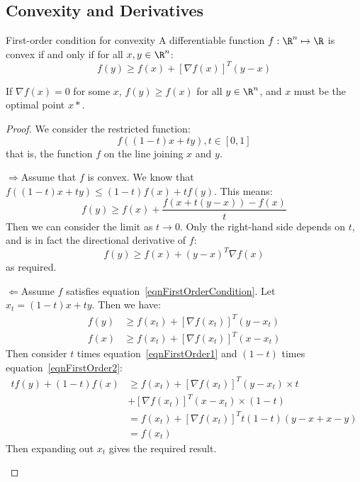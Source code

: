 \documentclass[../Main.tex]{subfiles}
\begin{document}
\subsection{Convexity and Derivatives}
\begin{theorem}{First-order condition for convexity}
    A differentiable function $f : \R^n \mapsto \R$ is convex if and only if for all $x, y \in \R^n$:
    \begin{equation}
        f(y) \geq f(x) + \left[\nabla f(x)\right]^T(y - x)
        \label{eqnFirstOrderCondition}
    \end{equation}
    \label{thmFirstOrderCondition}
\end{theorem}
\begin{remark}
    If $\nabla f(x) = 0$ for some $x$, $f(y) \geq f(x)$ for all $y \in \R^n$, and $x$ must be the optimal point $x*$.
\end{remark}
\begin{proof}
    We consider the restricted function:
    \begin{equation*}
        f((1-t)x + ty), t \in [0, 1]
    \end{equation*}
    that is, the function $f$ on the line joining $x$ and $y$.
    \begin{proofdirection}{$\Rightarrow$}{Assume that $f$ is convex.}
        We know that $f((1-t)x + ty) \leq (1-t)f(x) + tf(y)$. This means:
        \begin{equation*}
            f(y) \geq f(x) + \frac{f(x + t(y-x)) - f(x)}{t}
        \end{equation*}
        Then we can consider the limit as $t \to 0$. Only the right-hand side depends on $t$, and is in fact the directional derivative of $f$:
        \begin{equation*}
            f(y) \geq f(x) + (y - x)^T \nabla f(x)
        \end{equation*}
        as required.
    \end{proofdirection}
    \begin{proofdirection}{$\Leftarrow$}{Assume $f$ satisfies equation~\ref{eqnFirstOrderCondition}.}
        Let $x_t = (1 - t)x + ty$. Then we have:
        \begin{align}
            f(y) &\geq f(x_t) + \left[\nabla f(x_t)\right]^T (y - x_t) \label{eqnFirstOrder1} \\
            f(x) &\geq f(x_t) + \left[\nabla f(x_t)\right]^T (x - x_t) \label{eqnFirstOrder2}
        \end{align}
        Then consider $t$ times equation~\ref{eqnFirstOrder1} and $(1-t)$ times equation~\ref{eqnFirstOrder2}:
        \begin{align*}
            tf(y) + (1-t)f(x) &\geq f(x_t) + \left[\nabla f(x_t)\right]^T (y - x_t) \times t \\
            &+ \left[\nabla f(x_t)\right]^T (x - x_t) \times (1-t) \\
            &= f(x_t) + \left[\nabla f(x_t)\right]^T t(1-t)(y - x + x - y) \\
            &= f(x_t)
        \end{align*}
        Then expanding out $x_t$ gives the required result.
    \end{proofdirection}
\end{proof}
\end{document}
